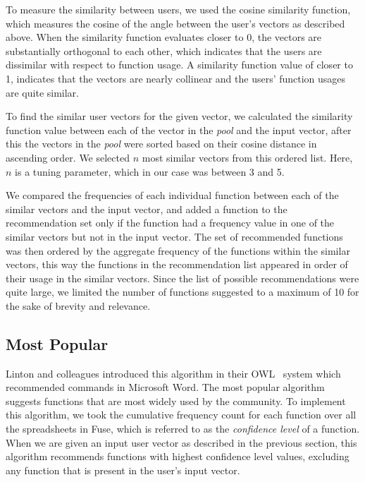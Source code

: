 \documentclass[conference]{IEEEtran}
\begin{document}
\begin{comment}
Given the function vector for two users $a$ and $b$ as $V_a$ and $V_b$ respectively, the similarity function $s$ is given by:

\begin{center}
	\[
	s(a, b) = \cos({}_{V_a}\theta_{V_b}) = \frac{V_a \cdot V_b}{||V_a|| ||V_b||} = \frac{\sum\limits_{k=1}^{n} V_{a_k}V_{b_k}}{\sqrt{\sum\limits_{k=1}^{n} {V_{a_k}}^2  {V_{b_k}}^2}}
	\]
\end{center}
\end{comment}

To measure the similarity between users, we used the cosine similarity function, which measures the cosine of the angle between the user's vectors as described above. When the similarity function evaluates closer to 0, the vectors are substantially orthogonal to each other, which indicates that the users are dissimilar with respect to function usage. A similarity function value of closer to 1, indicates that the vectors are nearly collinear and the users' function usages are quite similar.

To find the similar user vectors for the given vector, we calculated the similarity function value between each of the vector in the \textit{pool} and the input vector, after this the vectors in the \textit{pool} were sorted based on their cosine distance in ascending order. We selected $n$ most similar vectors from this ordered list. Here, $n$ is a tuning parameter, which in our case was between 3 and 5.

We compared the frequencies of each individual function between each of the similar vectors and the input vector, and added a function to the recommendation set only if the function had a frequency value in one of the similar vectors but not in the input vector. The set of recommended functions was then ordered by the aggregate frequency of the functions within the similar vectors, this way the functions in the recommendation list appeared in order of their usage in the similar vectors. Since the list of possible recommendations were quite large, we limited the number of functions suggested to a maximum of 10 for the sake of brevity and relevance.

\subsection{Most Popular}
Linton and colleagues introduced this algorithm in their OWL~\cite{linton2000owl} system which recommended commands in Microsoft Word. The most popular algorithm suggests functions that are most widely used by the community. To implement this algorithm, we took the cumulative frequency count for each function over all the spreadsheets in Fuse, which is referred to as the \textit{confidence level} of a function. When we are given an input user vector as described in the previous section, this algorithm recommends functions with highest confidence level values, excluding any function that is present in the user's input vector.
\end{document}
